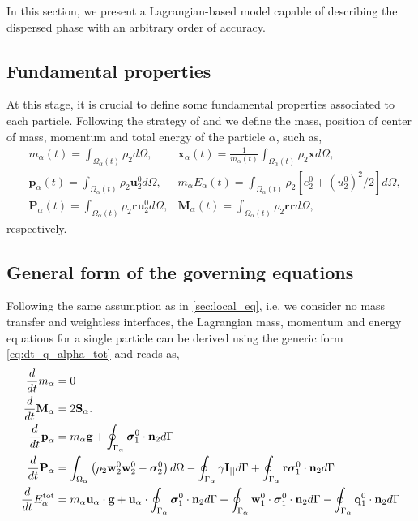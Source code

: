 In this section, we present a Lagrangian-based model capable of describing the dispersed phase with an arbitrary order of accuracy.

\subsection{Fundamental properties}

At this stage, it is crucial to define some fundamental properties associated to each particle.
Following the strategy of \citet{lhuillier2009rheology,lhuillier1992volume,zaepffel2011modelisation} and \citet[Chapter 2]{morel2015mathematical}
we define the mass, position of center of mass, momentum and total energy of the particle $\alpha$, such as,
\begin{align}
    &m_\alpha(t)
    = \int_{\Omega_\alpha(t)} \rho_2  d\Omega,
    &\textbf{x}_\alpha(t)
    = \frac{1}{m_\alpha(t) }\int_{\Omega_\alpha(t)} \rho_2 \textbf{x} d\Omega,\\
    &\textbf{p}_\alpha(t) 
    = \int_{\Omega_\alpha(t)} \rho_2 \textbf{u}_2^0 d\Omega,
    & m_\alpha E_\alpha(t) 
    = \int_{\Omega_\alpha(t)} \rho_2 [e_2^0 + (u_2^0)^2/2] d\Omega,\\
    &\textbf{P}_\alpha(t) 
    = \int_{\Omega_\alpha(t)} \rho_2 \textbf{r}\textbf{u}_2^0 d\Omega,
    &\textbf{M}_\alpha(t) 
    = \int_{\Omega_\alpha(t)} \rho_2 \textbf{rr} d\Omega,
    \label{eq:position_and_momentum_def}
\end{align}
respectively. 



\subsection{General form of the governing equations}
Following the same assumption as in \ref{sec:local_eq}, i.e. we consider no mass transfer and weightless interfaces, the Lagrangian  mass, momentum and energy equations for a single particle can be derived using the generic form \ref{eq:dt_q_alpha_tot} and reads as, 
\begin{align}
    \label{eq:dt_m_alpha}
    \frac{d}{dt} m_\alpha
    &= 
    0\\
    \frac{d}{dt} {\textbf{M}_\alpha}
    &=2\textbf{S}_\alpha. 
    \label{eq:dt_M_alpha}
    \\
    \label{eq:dt_p_alpha}
    \frac{d}{dt} \textbf{p}_\alpha
    &= 
    m_\alpha\textbf{g}
    +  \oint_{\Gamma_{\alpha}} \bm{\sigma}_1^0 \cdot \textbf{n}_2 d\Gamma\\
    \frac{d}{dt} {\textbf{P}_\alpha}
    &= \int_{\Omega_{\alpha}}  \left(
        \rho_2  \textbf{w}_2^0 \textbf{w}_2^0 
        - \bm{\sigma}_2^0
    \right)  d\Omega
    - \oint_{\Gamma_{\alpha}}  
        \gamma \textbf{I}_{||}
     d\Gamma
    + \oint_{\Gamma_{\alpha}}  \textbf{r}\bm{\sigma}_1^0\cdot \textbf{n}_2 d\Gamma 
    \label{eq:dt_P_alpha}\\
    \label{eq:dt_E_alpha}
    \frac{d}{dt} E_\alpha^\text{tot}
    &= 
    m_\alpha \textbf{u}_\alpha \cdot \textbf{g}
    +\textbf{u}_\alpha \cdot \oint_{\Gamma_{\alpha}} \bm{\sigma}_1^0 \cdot \textbf{n}_2 d\Gamma
    +\oint_{\Gamma_{\alpha}} \textbf{w}_1^0 \cdot \bm{\sigma}_1^0 \cdot  \textbf{n}_2 d\Gamma 
    - \oint_{\Gamma_{\alpha}} \textbf{q}_1^0 \cdot \textbf{n}_2 d\Gamma \\
\end{align}
